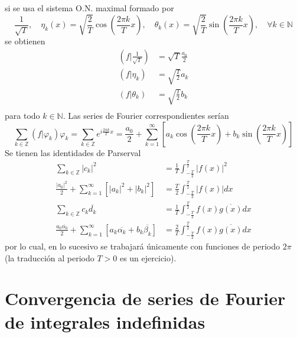 \documentclass[12pt]{report}
\newcounter{it}
\theoremstyle{largebreak}
\newcommand\abs[1]{\ensuremath{\left|#1\right|}}
\newcommand\pint[2]{\ensuremath{\left(#1\big| #2\right)}}
\begin{document}
    si se usa el sistema O.N. maximal formado por
    \begin{equation*}
        \frac{1}{\sqrt{T}},\quad\eta_k(x)=\sqrt{\frac{2}{T}}\cos\left(\frac{2\pi k}{T}x \right),\quad\theta_k(x)=\sqrt{\frac{2}{T}}\sin\left(\frac{2\pi k}{T}x \right),\quad\forall k\in\mathbb{N}
    \end{equation*}
    se obtienen
    \begin{equation*}
        \begin{split}
            \pint{f}{\frac{1}{\sqrt{T}}}&=\sqrt{T}\frac{a_0}{2}\\
            \pint{f}{\eta_k}&=\sqrt{\frac{T}{2}}a_k\\
            \pint{f}{\theta_k}&=\sqrt{\frac{T}{2}}b_k\\
        \end{split}
    \end{equation*}
    para todo $k\in\mathbb{N}$. Las series de Fourier correspondientes serían
    \begin{equation*}
        \sum_{ k\in\mathbb{Z}}\pint{f}{\varphi_k}\varphi_k=\sum_{ k\in\mathbb{Z}}e^{ i\frac{2\pi k}{T}x}=\frac{a_0}{2}+\sum_{ k=1}^\infty\left[a_k\cos\left(\frac{2\pi k}{T}x \right)+b_k\sin\left(\frac{2\pi k}{T}x \right) \right]
    \end{equation*}
    Se tienen las identidades de Parserval
    \begin{equation*}
        \begin{split}
            \sum_{ k\in\mathbb{Z}}\abs{c_k}^2&=\frac{1}{T}\int_{ -\frac{T}{2}}^{\frac{T}{2}}\abs{f(x)}^2\\
            \frac{\abs{a_0}^2}{2}+\sum_{ k=1}^\infty\left[\abs{a_k}^2+\abs{b_k}^2 \right]&=\frac{T}{2}\int_{ -\frac{T}{2}}^{\frac{T}{2}}\abs{f(x)}dx\\
            \sum_{ k\in\mathbb{Z}}c_k\overline{d_k}&=\frac{1}{T}\int_{ -\frac{T}{2}}^{\frac{T}{2}}f(x)\overline{g(x)}dx\\
            \frac{a_0\overline{\alpha_0}}{2}+\sum_{ k=1}^\infty\left[a_k\overline{\alpha_k}+b_k\overline{\beta_k} \right]&=\frac{2}{T}\int_{ -\frac{T}{2}}^{\frac{T}{2}}f(x)\overline{g(x)}dx
        \end{split}
    \end{equation*}
    por lo cual, en lo sucesivo se trabajará únicamente con funciones de periodo $2\pi$ (la traducción al periodo $T>0$ es un ejercicio).

    \section{Convergencia de series de Fourier de integrales indefinidas}
\end{document}
